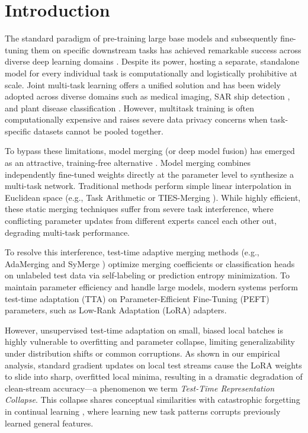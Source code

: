 \documentclass{article}
\theoremstyle{plain}
\theoremstyle{definition}
\theoremstyle{remark}
\begin{document}
\section{Introduction}
\label{submission-introduction}
The standard paradigm of pre-training large base models and subsequently fine-tuning them on specific downstream tasks has achieved remarkable success across diverse deep learning domains \cite{he2016deep, vaswani2017attention, devlin2018bert, dosovitskiy2021image}. Despite its power, hosting a separate, standalone model for every individual task is computationally and logistically prohibitive at scale. Joint multi-task learning offers a unified solution \cite{caruana1997multitask, collobert2008unified} and has been widely adopted across diverse domains such as medical imaging, SAR ship detection \cite{zhao2024multitask}, and plant disease classification \cite{hemalatha2024multitask}. However, multitask training is often computationally expensive and raises severe data privacy concerns when task-specific datasets cannot be pooled together.

To bypass these limitations, model merging (or deep model fusion) has emerged as an attractive, training-free alternative \cite{wortsman2022model, matena2022merging}. Model merging combines independently fine-tuned weights directly at the parameter level to synthesize a multi-task network. Traditional methods perform simple linear interpolation in Euclidean space (e.g., Task Arithmetic \cite{ilharco2022editing} or TIES-Merging \cite{yadav2023ties}). While highly efficient, these static merging techniques suffer from severe task interference, where conflicting parameter updates from different experts cancel each other out, degrading multi-task performance.

To resolve this interference, test-time adaptive merging methods (e.g., AdaMerging \cite{yang2024adamerging} and SyMerge \cite{jung2025symerge}) optimize merging coefficients or classification heads on unlabeled test data via self-labeling or prediction entropy minimization. To maintain parameter efficiency and handle large models, modern systems perform test-time adaptation (TTA) on Parameter-Efficient Fine-Tuning (PEFT) parameters, such as Low-Rank Adaptation (LoRA) \cite{hu2022lora} adapters. 

However, unsupervised test-time adaptation on small, biased local batches is highly vulnerable to overfitting and parameter collapse, limiting generalizability under distribution shifts or common corruptions. As shown in our empirical analysis, standard gradient updates on local test streams cause the LoRA weights to slide into sharp, overfitted local minima, resulting in a dramatic degradation of clean-stream accuracy—a phenomenon we term \emph{Test-Time Representation Collapse}. This collapse shares conceptual similarities with catastrophic forgetting in continual learning \cite{kirkpatrick2017overcoming, lopez2017gradient, zenke2017continual, aljundi2018memory}, where learning new task patterns corrupts previously learned general features.
\end{document}
